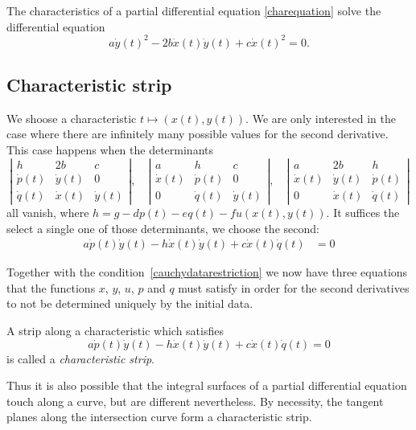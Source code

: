 \begin{satz}
\label{charakteristikendgl}
The characteristics of a partial differential equation
\eqref{charequation}
solve the differential equation
\[
a\dot y(t)^2-2b\dot x(t)\dot y(t)+c\dot x(t)^2=0.
\]
\end{satz}

\subsection{Characteristic strip}
We shoose a characteristic $t\mapsto(x(t),y(t))$.
We are only interested in the case where there are infinitely
many possible values for the second derivative.
This case happens when the determinants
\[
\left|
\begin{matrix}
h&2b&c\\
\dot p(t)&\dot y(t)&0\\
\dot q(t)&\dot x(t)&\dot y(t)
\end{matrix}
\right|
,
\quad
\left|
\begin{matrix}
a&h&c\\
\dot x(t)&\dot p(t)&0\\
0&\dot q(t)&\dot y(t)
\end{matrix}
\right|
,
\quad
\left|
\begin{matrix}
a&2b&h\\
\dot x(t)&\dot y(t)&\dot p(t)\\
0&\dot x(t)&\dot q(t)
\end{matrix}
\right|
\]
all vanish, where $h=g-dp(t)-eq(t)-fu(x(t),y(t))$.
It suffices the select a single one of those determinants,
we choose the second:
\begin{align*}
a\dot p(t)\dot y(t)-h\dot x(t)\dot y(t)+c\dot x(t)\dot q(t)&=0
\end{align*}

Together with the condition~\eqref{cauchydatarestriction}
we now have three equations that the functions
$x$, $y$, $u$, $p$ and $q$ must satisfy in order for the second
derivatives to not be determined uniquely by the initial data.

\begin{definition}
A strip along a characteristic which satisfies
\[
a\dot p(t)\dot y(t)-h\dot x(t)\dot y(t)+c\dot x(t)\dot q(t)=0
\]
is called a {\em characteristic strip}.
\end{definition}

Thus it is also possible that the integral surfaces of a partial
differential equation touch along a curve, but are different
nevertheless.
By necessity, the tangent planes along the intersection curve form
a characteristic strip.

